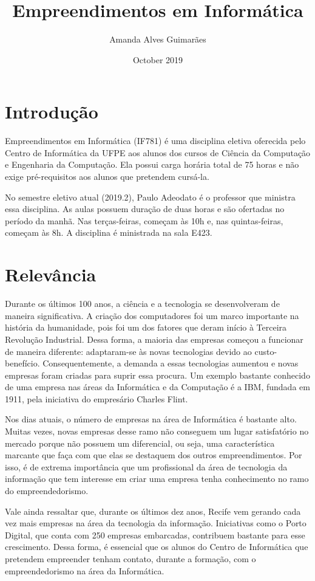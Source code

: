 \documentclass[a4paper, 10pt]{article}
\title{Empreendimentos em Informática}
\author{Amanda Alves Guimarães}
\date{October 2019}
\begin{document}
\maketitle

\section{Introdução}
Empreendimentos em Informática (IF781) é uma disciplina eletiva oferecida pelo Centro de Informática da UFPE aos alunos dos cursos de Ciência da Computação e Engenharia da Computação. Ela possui carga horária total de 75 horas e não exige pré-requisitos aos alunos que pretendem cursá-la. \par
No semestre eletivo atual (2019.2), Paulo Adeodato é o professor que ministra essa disciplina. As aulas possuem duração de duas horas e são ofertadas no período da manhã. Nas terças-feiras, começam às 10h e, nas quintas-feiras, começam às 8h. A disciplina é ministrada na sala E423.

\section{Relevância}
Durante os últimos 100 anos, a ciência e a tecnologia se desenvolveram de maneira significativa. A criação dos computadores foi um marco importante na história da humanidade, pois foi um dos fatores que deram início à Terceira Revolução Industrial. Dessa forma, a maioria das empresas começou a funcionar de maneira diferente: adaptaram-se às novas tecnologias devido ao custo-benefício. Consequentemente, a demanda a essas tecnologias aumentou e novas empresas foram criadas para suprir essa procura. Um exemplo bastante conhecido de uma empresa nas áreas da Informática e da Computação é a IBM, fundada em 1911, pela iniciativa do empresário Charles Flint.\cite{ibm}

Nos dias atuais, o número de empresas na área de Informática é bastante alto. Muitas vezes, novas empresas desse ramo não conseguem um lugar satisfatório no mercado porque não possuem um diferencial, ou seja, uma característica marcante que faça com que elas se destaquem dos outros empreendimentos. Por isso, é de extrema importância que um profissional da área de tecnologia da informação que tem interesse em criar uma empresa tenha conhecimento no ramo do empreendedorismo.

Vale ainda ressaltar que, durante os últimos dez anos, Recife vem gerando cada vez mais empresas na área da tecnologia da informação. Iniciativas como o Porto Digital, que conta com 250 empresas embarcadas, contribuem bastante para esse crescimento. Dessa forma, é essencial que os alunos do Centro de Informática que pretendem empreender tenham contato, durante a formação, com o empreendedorismo na área da Informática.
\end{document}
